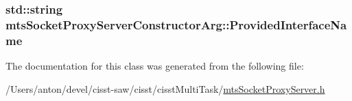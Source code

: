 \subsubsection[{Provided\+Interface\+Name}]{\setlength{\rightskip}{0pt plus 5cm}std\+::string mts\+Socket\+Proxy\+Server\+Constructor\+Arg\+::\+Provided\+Interface\+Name}\label{classmts_socket_proxy_server_constructor_arg_a4139b875611ccc0e0e3ab736de92262a}


The documentation for this class was generated from the following file\+:\begin{DoxyCompactItemize}
\item 
/\+Users/anton/devel/cisst-\/saw/cisst/cisst\+Multi\+Task/\hyperlink{mts_socket_proxy_server_8h}{mts\+Socket\+Proxy\+Server.\+h}\end{DoxyCompactItemize}
